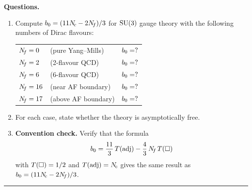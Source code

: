 \documentclass[11pt,a4paper]{article}
\begin{document}
\medskip
\noindent\textbf{Questions.}
\begin{enumerate}[label=(\alph*)]
  \item Compute $b_0 = (11N_{\!c} - 2N_{\!f})/3$ for $\mathrm{SU}(3)$ gauge theory
    with the following numbers of Dirac flavours:

    \begin{center}
    \renewcommand{\arraystretch}{1.2}
    \begin{tabular}{@{}l l l@{}}
    $N_{\!f} = 0$ & (pure Yang--Mills) & $b_0 = ?$ \\
    $N_{\!f} = 2$ & (2-flavour QCD) & $b_0 = ?$ \\
    $N_{\!f} = 6$ & (6-flavour QCD) & $b_0 = ?$ \\
    $N_{\!f} = 16$ & (near AF boundary) & $b_0 = ?$ \\
    $N_{\!f} = 17$ & (above AF boundary) & $b_0 = ?$ \\
    \end{tabular}
    \end{center}

  \item For each case, state whether the theory is asymptotically free.

  \item \textbf{Convention check.} Verify that the formula
    \begin{equation}
      b_0 = \frac{11}{3}\,T(\mathrm{adj}) - \frac{4}{3}\,N_{\!f}\,T(\square)
    \end{equation}
    with $T(\square) = 1/2$ and $T(\mathrm{adj}) = N_{\!c}$ gives the same result as
    $b_0 = (11N_{\!c} - 2N_{\!f})/3$.
\end{enumerate}

\bigskip
\hrule
\bigskip
\end{document}
